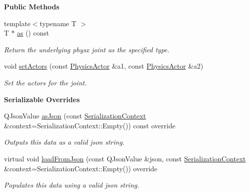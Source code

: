 \begin{Indent}\textbf{ Public Methods}\par
\begin{DoxyCompactItemize}
\item 
\mbox{\label{classrev_1_1_physics_joint_a86ea8d9e865350931d738a091488ba8f}} 
{\footnotesize template$<$typename T $>$ }\\T $\ast$ \mbox{\hyperlink{classrev_1_1_physics_joint_a86ea8d9e865350931d738a091488ba8f}{as}} () const
\begin{DoxyCompactList}\small\item\em Return the underlying physx joint as the specified type. \end{DoxyCompactList}\item 
\mbox{\label{classrev_1_1_physics_joint_acf0296ba46833f1bfd072cd420e9556d}} 
void \mbox{\hyperlink{classrev_1_1_physics_joint_acf0296ba46833f1bfd072cd420e9556d}{set\+Actors}} (const \mbox{\hyperlink{classrev_1_1_physics_actor}{Physics\+Actor}} \&a1, const \mbox{\hyperlink{classrev_1_1_physics_actor}{Physics\+Actor}} \&a2)
\begin{DoxyCompactList}\small\item\em Set the actors for the joint. \end{DoxyCompactList}\end{DoxyCompactItemize}
\end{Indent}
\begin{Indent}\textbf{ Serializable Overrides}\par
\begin{DoxyCompactItemize}
\item 
\mbox{\label{classrev_1_1_physics_joint_a64e2b78627a68cff0d12f4d4bf87d1d0}} 
Q\+Json\+Value \mbox{\hyperlink{classrev_1_1_physics_joint_a64e2b78627a68cff0d12f4d4bf87d1d0}{as\+Json}} (const \mbox{\hyperlink{structrev_1_1_serialization_context}{Serialization\+Context}} \&context=Serialization\+Context\+::\+Empty()) const override
\begin{DoxyCompactList}\small\item\em Outputs this data as a valid json string. \end{DoxyCompactList}\item 
\mbox{\label{classrev_1_1_physics_joint_aa5024444d1f39f294a17efa7071a4dbe}} 
virtual void \mbox{\hyperlink{classrev_1_1_physics_joint_aa5024444d1f39f294a17efa7071a4dbe}{load\+From\+Json}} (const Q\+Json\+Value \&json, const \mbox{\hyperlink{structrev_1_1_serialization_context}{Serialization\+Context}} \&context=Serialization\+Context\+::\+Empty()) override
\begin{DoxyCompactList}\small\item\em Populates this data using a valid json string. \end{DoxyCompactList}\end{DoxyCompactItemize}
\end{Indent}
